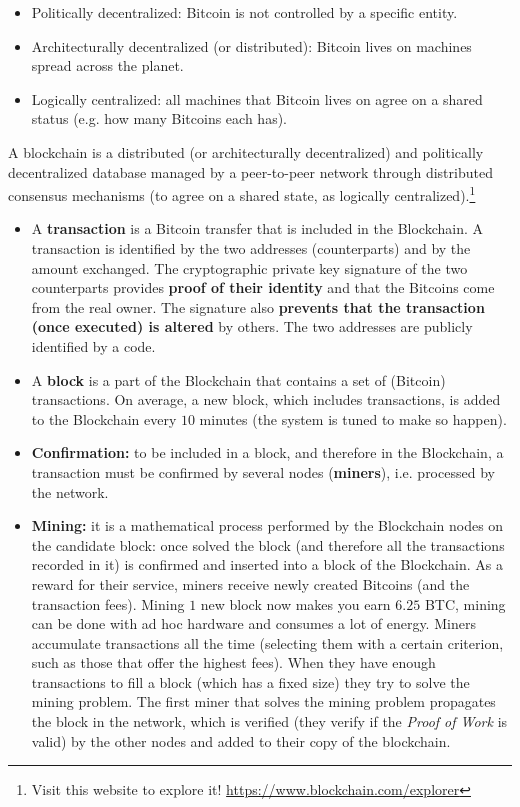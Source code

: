 \begin{itemize}
	\item Politically decentralized: Bitcoin is not controlled by a specific entity.
	\item Architecturally decentralized (or distributed): Bitcoin lives on machines spread across the planet.
	\item Logically centralized: all machines that Bitcoin lives on agree on a shared status (e.g. how many Bitcoins each has).
\end{itemize}

A blockchain is a distributed (or architecturally decentralized) and politically decentralized database managed by a peer-to-peer network through distributed consensus mechanisms (to agree on a shared state, as logically centralized).\footnote{Visit this website to explore it! \url{https://www.blockchain.com/explorer}}
\begin{itemize}
	\item A \textbf{transaction} is a Bitcoin transfer that is included in the Blockchain. A transaction is identified by the two addresses (counterparts) and by the amount exchanged. The cryptographic private key signature of the two counterparts provides \textbf{proof of their identity} and that the Bitcoins come from the real owner. The signature also \textbf{prevents that the transaction (once executed) is altered} by others. The two addresses are publicly identified by a code.
\end{itemize}


\begin{itemize}
	\item A \textbf{block} is a part of the Blockchain that contains a set of (Bitcoin) transactions. On average, a new block, which includes transactions, is added to the Blockchain every $10$ minutes (the system is tuned to make so happen).
	\item \textbf{Confirmation:} to be included in a block, and therefore in the Blockchain, a transaction must be confirmed by several nodes (\textbf{miners}), i.e. processed by the network.
	\item \textbf{Mining:} it is a mathematical process performed by the Blockchain nodes on the candidate block: once solved the block (and therefore all the transactions recorded in it) is confirmed and inserted into a block of the Blockchain. As a reward for their service, miners receive newly created Bitcoins (and the transaction fees). Mining $1$ new block now makes you earn $6.25$ BTC, mining can be done with ad hoc hardware and consumes a lot of energy.
	Miners accumulate transactions all the time (selecting them with a certain criterion, such as those that offer the highest fees). When they have enough transactions to fill a block (which has a fixed size) they try to solve the mining problem. The first miner that solves the mining problem propagates the block in the network, which is verified (they verify if the \textit{Proof of Work} is valid) by the other nodes and added to their copy of the blockchain.
\end{itemize}


